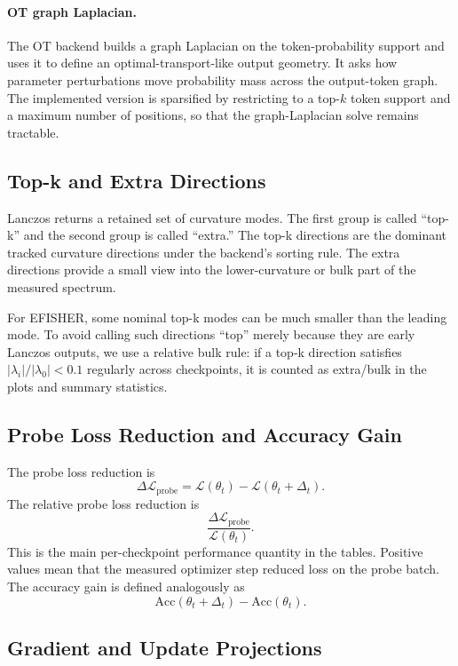 \documentclass[11pt]{article}
\begin{document}
\paragraph{OT graph Laplacian.}
The OT backend builds a graph Laplacian on the token-probability support and
uses it to define an optimal-transport-like output geometry. It asks how
parameter perturbations move probability mass across the output-token graph.
The implemented version is sparsified by restricting to a top-$k$ token support
and a maximum number of positions, so that the graph-Laplacian solve remains
tractable.

\subsection{Top-k and Extra Directions}

Lanczos returns a retained set of curvature modes. The first group is called
``top-k'' and the second group is called ``extra.'' The top-k directions are
the dominant tracked curvature directions under the backend's sorting rule.
The extra directions provide a small view into the lower-curvature or bulk
part of the measured spectrum.

For EFISHER, some nominal top-k modes can be much smaller than the leading
mode. To avoid calling such directions ``top'' merely because they are early
Lanczos outputs, we use a relative bulk rule: if a top-k direction satisfies
$|\lambda_i|/|\lambda_0| < 0.1$ regularly across checkpoints, it is counted as
extra/bulk in the plots and summary statistics.

\subsection{Probe Loss Reduction and Accuracy Gain}

The probe loss reduction is
\[
    \Delta \mathcal{L}_{\mathrm{probe}}
    = \mathcal{L}(\theta_t) - \mathcal{L}(\theta_t + \Delta_t).
\]
The relative probe loss reduction is
\[
    \frac{\Delta \mathcal{L}_{\mathrm{probe}}}{\mathcal{L}(\theta_t)}.
\]
This is the main per-checkpoint performance quantity in the tables. Positive
values mean that the measured optimizer step reduced loss on the probe batch.
The accuracy gain is defined analogously as
\[
    \mathrm{Acc}(\theta_t + \Delta_t) - \mathrm{Acc}(\theta_t).
\]

\subsection{Gradient and Update Projections}
\end{document}
